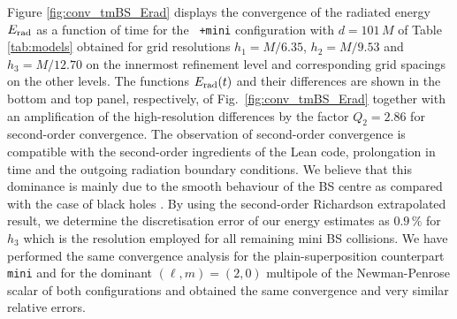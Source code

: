 \documentclass[]{iopart}
\begin{document}
Figure \ref{fig:conv_tmBS_Erad} displays the convergence of the
radiated energy $E_{\rm rad}$ as a function of time for the {\tt
+mini} configuration with $d=101\,M$ of Table \ref{tab:models}
obtained for grid resolutions $h_1=M/6.35$, $h_2=M/9.53$ and
$h_3=M/12.70$ on the innermost refinement level and corresponding
grid spacings on the other levels. The functions $E_{\rm rad}(t)$
and their differences are shown in the bottom and top panel,
respectively, of Fig.~\ref{fig:conv_tmBS_Erad} together with an
amplification of the high-resolution differences by the factor
$Q_2=2.86$ for second-order convergence. The observation of
second-order convergence is compatible with the second-order
ingredients of the {\sc Lean} code, prolongation in time and the
outgoing radiation boundary conditions. We believe that this dominance
is mainly due to the smooth behaviour of the BS centre as compared
with the case of black holes \cite{Husa:2007hp}. By using the
second-order Richardson extrapolated result, we determine the
discretisation error of our energy estimates as $0.9\,\%$ for $h_3$
which is the resolution employed for all remaining mini BS collisions.
We have performed the same convergence analysis for the plain-superposition
counterpart {\tt mini} and for the dominant $(\ell,m)=(2,0)$ multipole
of the Newman-Penrose scalar of both configurations and obtained
the same convergence and very similar relative errors.
\end{document}
